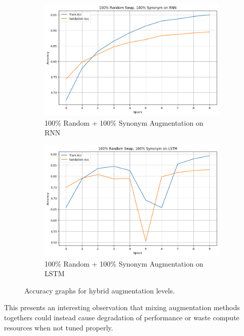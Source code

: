 \documentclass[10pt]{extarticle}
\begin{document}
\begin{figure}[H]
  \centering
  \begin{subfigure}[b]{0.45\textwidth}
    \includegraphics[width=\textwidth]{img/random_100_synonym_100_rnn.png}
    \caption{100\% Random + 100\% Synonym Augmentation on RNN}
    \label{fig:random_100_synonym_100_rnn}
  \end{subfigure}
  \hfill
  \begin{subfigure}[b]{0.45\textwidth}
    \includegraphics[width=\textwidth]{img/random_100_synonym_100_lstm.png}
    \caption{100\% Random + 100\% Synonym Augmentation on LSTM}
    \label{fig:random_100_synonym_100_lstm}
  \end{subfigure}
  \caption{Accuracy graphs for hybrid augmentation levels.}
  \label{fig:hybrid_extreme_substitution_acc_100100}
\end{figure}

This presents an interesting observation that mixing augmentation methods
togethers could instead cause degradation of performance or waste compute
resources when not tuned properly.
\end{document}
